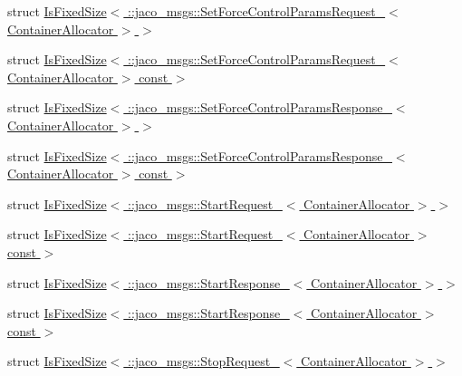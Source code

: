 \begin{DoxyCompactItemize}
\item 
struct \hyperlink{structros_1_1message__traits_1_1IsFixedSize_3_01_1_1jaco__msgs_1_1SetForceControlParamsRequest__2487360664878e89c340edfa5baef7b5}{Is\+Fixed\+Size$<$ \+::jaco\+\_\+msgs\+::\+Set\+Force\+Control\+Params\+Request\+\_\+$<$ Container\+Allocator $>$ $>$}
\item 
struct \hyperlink{structros_1_1message__traits_1_1IsFixedSize_3_01_1_1jaco__msgs_1_1SetForceControlParamsRequest__09b702f8420bd83419a6253f0f7f7347}{Is\+Fixed\+Size$<$ \+::jaco\+\_\+msgs\+::\+Set\+Force\+Control\+Params\+Request\+\_\+$<$ Container\+Allocator $>$ const  $>$}
\item 
struct \hyperlink{structros_1_1message__traits_1_1IsFixedSize_3_01_1_1jaco__msgs_1_1SetForceControlParamsResponse_aa5178e6be7e0e9119944f229d6572ac}{Is\+Fixed\+Size$<$ \+::jaco\+\_\+msgs\+::\+Set\+Force\+Control\+Params\+Response\+\_\+$<$ Container\+Allocator $>$ $>$}
\item 
struct \hyperlink{structros_1_1message__traits_1_1IsFixedSize_3_01_1_1jaco__msgs_1_1SetForceControlParamsResponse_11b3e344d69afcba56565de846761b50}{Is\+Fixed\+Size$<$ \+::jaco\+\_\+msgs\+::\+Set\+Force\+Control\+Params\+Response\+\_\+$<$ Container\+Allocator $>$ const  $>$}
\item 
struct \hyperlink{structros_1_1message__traits_1_1IsFixedSize_3_01_1_1jaco__msgs_1_1StartRequest___3_01ContainerAllocator_01_4_01_4}{Is\+Fixed\+Size$<$ \+::jaco\+\_\+msgs\+::\+Start\+Request\+\_\+$<$ Container\+Allocator $>$ $>$}
\item 
struct \hyperlink{structros_1_1message__traits_1_1IsFixedSize_3_01_1_1jaco__msgs_1_1StartRequest___3_01ContainerAllocator_01_4_01const_01_01_4}{Is\+Fixed\+Size$<$ \+::jaco\+\_\+msgs\+::\+Start\+Request\+\_\+$<$ Container\+Allocator $>$ const  $>$}
\item 
struct \hyperlink{structros_1_1message__traits_1_1IsFixedSize_3_01_1_1jaco__msgs_1_1StartResponse___3_01ContainerAllocator_01_4_01_4}{Is\+Fixed\+Size$<$ \+::jaco\+\_\+msgs\+::\+Start\+Response\+\_\+$<$ Container\+Allocator $>$ $>$}
\item 
struct \hyperlink{structros_1_1message__traits_1_1IsFixedSize_3_01_1_1jaco__msgs_1_1StartResponse___3_01ContainerAllocator_01_4_01const_01_01_4}{Is\+Fixed\+Size$<$ \+::jaco\+\_\+msgs\+::\+Start\+Response\+\_\+$<$ Container\+Allocator $>$ const  $>$}
\item 
struct \hyperlink{structros_1_1message__traits_1_1IsFixedSize_3_01_1_1jaco__msgs_1_1StopRequest___3_01ContainerAllocator_01_4_01_4}{Is\+Fixed\+Size$<$ \+::jaco\+\_\+msgs\+::\+Stop\+Request\+\_\+$<$ Container\+Allocator $>$ $>$}

\end{DoxyCompactItemize}
